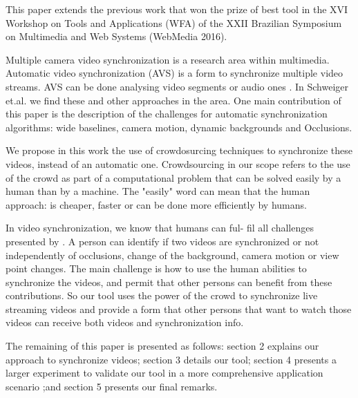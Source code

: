 This paper extends the previous work \cite{delivesync} that won the prize of best tool in the XVI Workshop on Tools and Applications (WFA) of the XXII Brazilian Symposium on Multimedia and Web Systems (WebMedia 2016).

Multiple camera video synchronization is a research area within multimedia. Automatic video synchronization (AVS) is a form to synchronize multiple video streams. AVS can be done analysing video segments \cite{wang2014videosnapping} or audio ones \cite{su2012making}. In Schweiger et.al.\cite{schweiger2013fully} we find these and other approaches in the area. One main contribution of this paper is the description of the challenges for automatic synchronization algorithms: wide baselines, camera motion, dynamic backgrounds and Occlusions.

We propose in this work the use of crowdosurcing techniques to synchronize these videos, instead of an automatic one. Crowdsourcing\cite{howe2006rise} in our scope refers to the use of the crowd as part of a computational problem that can be solved easily by a human than by a machine. The "easily" word can mean that the human approach: is cheaper, faster or can be done more efficiently by humans.

In video synchronization, we know that humans can ful- fil all challenges presented by \cite{schweiger2013fully}. A person can identify if two videos are synchronized or not independently of occlusions, change of the background, camera motion or view point changes. The main challenge is how to use the human abilities to synchronize the videos, and permit that other persons can benefit from these contributions. So our tool uses the power of the crowd to synchronize live streaming videos and provide a form that other persons that want to watch those videos can receive both videos and synchronization info.

The remaining of this paper is presented as follows: section 2 explains our approach to synchronize videos; section 3 details our tool; section 4 presents a larger experiment to validate our tool in a more comprehensive application scenario ;and section 5 presents our final remarks.


